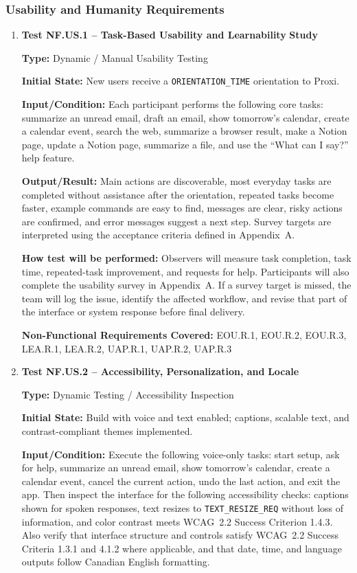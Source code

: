 \documentclass[12pt, titlepage]{article}
\begin{document}
\subsubsection{Usability and Humanity Requirements}

\begin{enumerate}

\item \textbf{Test NF.US.1 -- Task-Based Usability and Learnability}
\textbf{Study}

\textbf{Type:} Dynamic / Manual Usability Testing

\textbf{Initial State:} New users receive a
\texttt{ORIENTATION\_TIME} orientation to Proxi.

\textbf{Input/Condition:} Each participant performs the following core
tasks:
summarize an unread email, draft an email, show tomorrow's calendar,
create a calendar event, search the web, summarize a browser result,
make a Notion page, update a Notion page, summarize a file, and use the
``What can I say?'' help feature.

\textbf{Output/Result:} Main actions are discoverable, most everyday
tasks are completed without assistance after the orientation, repeated
tasks become faster, example commands are easy to find, messages are
clear, risky actions are confirmed, and error messages suggest a next
step. Survey targets are interpreted using the acceptance criteria
defined in Appendix~A.

\textbf{How test will be performed:} Observers will measure task
completion, task time, repeated-task improvement, and requests for help.
Participants will also complete the usability survey in Appendix~A. If
a survey target is missed, the team will log the issue, identify the
affected workflow, and revise that part of the interface or system
response before final delivery.

\textbf{Non-Functional Requirements Covered:} EOU.R.1, EOU.R.2,
EOU.R.3, LEA.R.1, LEA.R.2, UAP.R.1, UAP.R.2, UAP.R.3

\item \textbf{Test NF.US.2 -- Accessibility, Personalization, and}
\textbf{Locale}

\textbf{Type:} Dynamic Testing / Accessibility Inspection

\textbf{Initial State:} Build with voice and text enabled; captions,
scalable text, and contrast-compliant themes implemented.

\textbf{Input/Condition:} Execute the following voice-only tasks:
start setup, ask for help, summarize an unread email, show tomorrow's
calendar, create a calendar event, cancel the current action, undo the
last action, and exit the app. Then inspect the interface for the
following accessibility checks: captions shown for spoken responses,
text resizes to \texttt{TEXT\_RESIZE\_REQ} without loss of information,
and color contrast meets WCAG~2.2 Success Criterion 1.4.3. Also verify
that interface structure and controls satisfy WCAG~2.2 Success
Criteria 1.3.1 and 4.1.2 where applicable, and that date, time, and
language outputs follow Canadian English formatting.


\end{enumerate}
\end{document}
